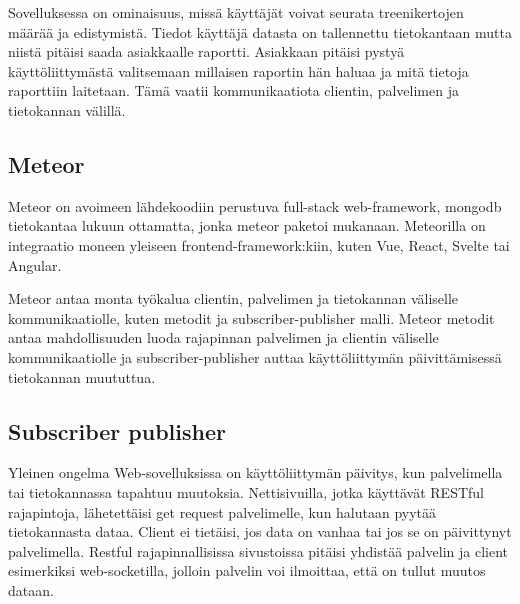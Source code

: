 


Sovelluksessa on ominaisuus, missä käyttäjät voivat seurata treenikertojen määrää ja edistymistä.
Tiedot käyttäjä datasta on tallennettu tietokantaan mutta niistä pitäisi saada asiakkaalle raportti.
Asiakkaan pitäisi pystyä käyttöliittymästä valitsemaan millaisen raportin hän haluaa ja mitä tietoja raporttiin laitetaan.
Tämä vaatii kommunikaatiota clientin, palvelimen ja tietokannan välillä. 
\medskip

\subsection*{Meteor}


Meteor on avoimeen lähdekoodiin perustuva full-stack web-framework, mongodb tietokantaa lukuun ottamatta, jonka meteor paketoi mukanaan.
Meteorilla on integraatio moneen yleiseen frontend-framework:kiin, kuten Vue, React, Svelte tai Angular.
\medskip




Meteor antaa monta työkalua clientin, palvelimen ja tietokannan väliselle kommunikaatiolle, kuten metodit ja subscriber-publisher malli.
Meteor metodit antaa mahdollisuuden luoda rajapinnan palvelimen ja clientin väliselle kommunikaatiolle ja 
subscriber-publisher auttaa käyttöliittymän päivittämisessä tietokannan muututtua.





\medskip







\subsection*{Subscriber publisher}

Yleinen ongelma Web-sovelluksissa on käyttöliittymän päivitys, kun palvelimella tai tietokannassa tapahtuu muutoksia. 
Nettisivuilla, jotka käyttävät RESTful rajapintoja, lähetettäisi get request palvelimelle, kun halutaan pyytää tietokannasta dataa. Client ei tietäisi, jos data on vanhaa tai jos se on päivittynyt palvelimella.
Restful rajapinnallisissa sivustoissa pitäisi yhdistää palvelin ja client esimerkiksi web-socketilla, jolloin palvelin voi ilmoittaa, että on tullut muutos dataan.

